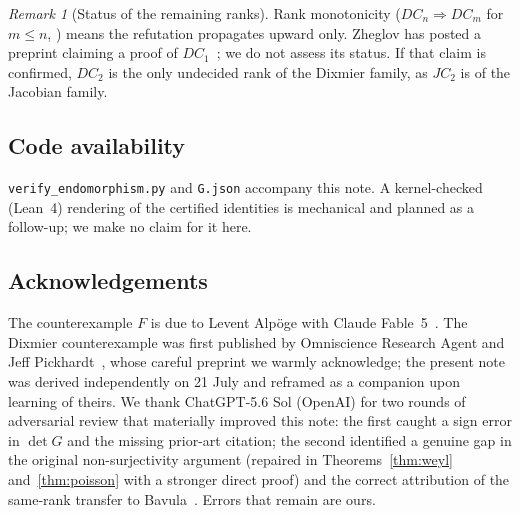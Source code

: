 \documentclass[11pt]{article}
\theoremstyle{remark}
\newtheorem{remark}[theorem]{Remark}
\begin{document}
\begin{remark}[Status of the remaining ranks]
Rank monotonicity ($DC_n\Rightarrow DC_m$ for $m\le n$,
\cite[Prop.~9]{OP2026}) means the refutation propagates upward only.
Zheglov has posted a preprint claiming a proof of
$DC_1$~\cite{Zheglov2024}; we do not assess its status. If that claim is
confirmed, $DC_2$ is the only undecided rank of the Dixmier family, as
$JC_2$ is of the Jacobian family.
\end{remark}

\subsection*{Code availability}
\texttt{verify\_endomorphism.py} and \texttt{G.json} accompany this note.
A kernel-checked (Lean~4) rendering of the certified identities is
mechanical and planned as a follow-up; we make no claim for it here.

\subsection*{Acknowledgements}
The counterexample $F$ is due to Levent Alp\"oge with Claude
Fable~5~\cite{Alpoge2026}. The Dixmier counterexample was first published
by Omniscience Research Agent and Jeff Pickhardt~\cite{OP2026}, whose
careful preprint we warmly acknowledge; the present note was derived
independently on 21 July and reframed as a companion upon learning of
theirs. We thank ChatGPT-5.6 Sol (OpenAI) for two rounds of adversarial review
that materially improved this note: the first caught a sign error in
$\det G$ and the missing prior-art citation; the second identified a
genuine gap in the original non-surjectivity argument (repaired in
Theorems~\ref{thm:weyl} and~\ref{thm:poisson} with a stronger direct
proof) and the correct attribution of the same-rank transfer to
Bavula~\cite[Thm.~7]{Bavula2024}. Errors that remain are ours.
\end{document}
